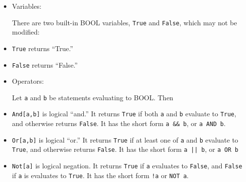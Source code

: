 \begin{itemize}
\item
Variables:

There are two built-in BOOL variables, \verb+True+  and \verb+False+, which
may not be modified: 

\bd
\item
\verb+True+ returns ``True.''

\item
\verb+False+ returns ``False.''
\ed

\item
Operators:

Let \verb+a+ and \verb+b+ be statements evaluating to BOOL. Then  

\bd
\item
\verb+And[a,b]+ is logical ``and.''  It returns \verb+True+ if
both \verb+a+ and \verb+b+ evaluate to \verb+True+, and otherwise
returns \verb+False+.  It has the short form \verb+a && b+, or
\verb+a AND b+. 

\item
\verb+Or[a,b]+ is logical ``or.''  It returns \verb+True+ if
at least one of \verb+a+ and \verb+b+ evaluate to \verb+True+, and otherwise
returns \verb+False+. It has the short form \verb+a || b+, 
or \verb+a OR b+

\item
\verb+Not[a]+ is logical negation.  It returns \verb+True+ if \verb+a+
evaluates to \verb+False+, and \verb+False+ if \verb+a+ is evaluates
to \verb+True+.  It has the short form \verb+!a+ or \verb+NOT a+.
\ed 
\end{itemize}


